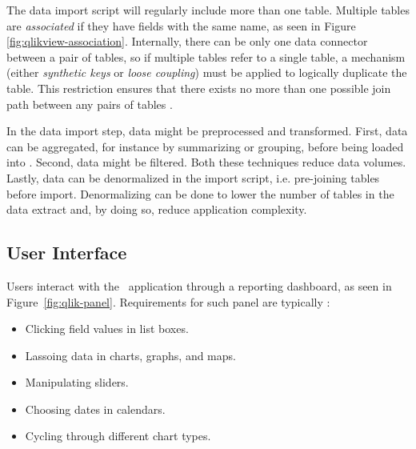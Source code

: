 
The data import script will regularly include more than one table. Multiple tables are \textit{associated} if they have fields with the same name, as seen in Figure \ref{fig:qlikview-association}. Internally, there can be only one data connector between a pair of tables, so if multiple tables refer to a single table, a mechanism (either \textit{synthetic keys} or \textit{loose coupling}) must be applied to logically duplicate the table. This restriction ensures that there exists no more than one possible join path between any pairs of tables \cite{noauthor_undated-js}.

In the data import step, data might be preprocessed and transformed. First, data can be aggregated, for instance by summarizing or grouping, before being loaded into \qlikview. Second, data might be filtered. Both these techniques reduce data volumes. Lastly, data can be denormalized in the import script, i.e. pre-joining tables before import. Denormalizing can be done to lower the number of tables in the data extract and, by doing so, reduce application complexity.

\subsection{User Interface}
\label{sub:User Interface}
Users interact with the \bd~application through a reporting dashboard, as seen in Figure~\ref{fig:qlik-panel}. Requirements for such panel are typically \cite{Qlik2014-vd}:
\begin{itemize}
  \item Clicking field values in list boxes.
  \item Lassoing data in charts, graphs, and maps.
  \item Manipulating sliders.
  \item Choosing dates in calendars.
  \item Cycling through different chart types.
\end{itemize}

